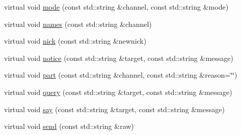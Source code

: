 \begin{DoxyCompactItemize}
virtual void \hyperlink{a00055_ae3b4e6d84d6590785570686067052fbb}{mode} (const std\-::string \&channel, const std\-::string \&mode)
\begin{DoxyCompactList}\small\item\em \end{DoxyCompactList}\item 
virtual void \hyperlink{a00055_a3a6231edd3de2ef098b097cd78f8bbdc}{names} (const std\-::string \&channel)
\begin{DoxyCompactList}\small\item\em \end{DoxyCompactList}\item 
virtual void \hyperlink{a00055_acfc30a5f0f0311efbc0c9feda8b7e2ba}{nick} (const std\-::string \&newnick)
\begin{DoxyCompactList}\small\item\em \end{DoxyCompactList}\item 
virtual void \hyperlink{a00055_a8ace179cbc990a66435f7c9b6ed3ad37}{notice} (const std\-::string \&target, const std\-::string \&message)
\begin{DoxyCompactList}\small\item\em \end{DoxyCompactList}\item 
virtual void \hyperlink{a00055_a0dc67bc7c8b1f714618e3ef6c2f4022f}{part} (const std\-::string \&channel, const std\-::string \&reason=\char`\"{}\char`\"{})
\begin{DoxyCompactList}\small\item\em \end{DoxyCompactList}\item 
virtual void \hyperlink{a00055_a1280f2bf5a344b7ae007e5dcbcce6a69}{query} (const std\-::string \&target, const std\-::string \&message)
\begin{DoxyCompactList}\small\item\em \end{DoxyCompactList}\item 
virtual void \hyperlink{a00055_ad53352232e2072725293300d1b7edef1}{say} (const std\-::string \&target, const std\-::string \&message)
\begin{DoxyCompactList}\small\item\em \end{DoxyCompactList}\item 
virtual void \hyperlink{a00055_ab973bf213fb6451a4ca4212f69a6481c}{send} (const std\-::string \&raw)
\begin{DoxyCompactList}\small\item\em \end{DoxyCompactList}\item 

\end{DoxyCompactItemize}
